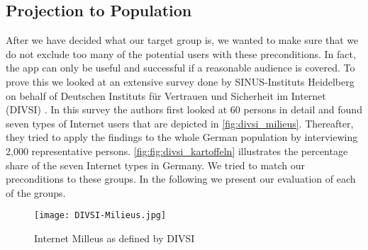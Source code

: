 \subsection{Projection to Population}
After we have decided what our target group is, we wanted to make sure that we do not exclude too many of the potential users with these preconditions.
In fact, the app can only be useful and successful if a reasonable audience is covered.
To prove this we looked at an extensive survey done by SINUS-Instituts Heidelberg on behalf of Deutschen Instituts f\"{u}r Vertrauen und Sicherheit im Internet (DIVSI) \cite{divsi2012divsi}.
In this survey the authors first looked at 60 persons in detail and found seven types of Internet users that are depicted in \autoref{fig:divsi_milieus}.
Thereafter, they tried to apply the findings to the whole German population by interviewing 2,000 representative persons.
\autoref{fig:fig:divsi_kartoffeln} illustrates the percentage share of the seven Internet types in Germany.
We tried to match our preconditions to these groups. In the following we present our evaluation of each of the groups.

\begin{figure}[hHtbp]
\centering
\texttt{[image: DIVSI-Milieus.jpg]}
\caption{Internet Milleus as defined by DIVSI \cite{divsi2012divsi}}
\label{fig:divsi_milieus}
\end{figure}

